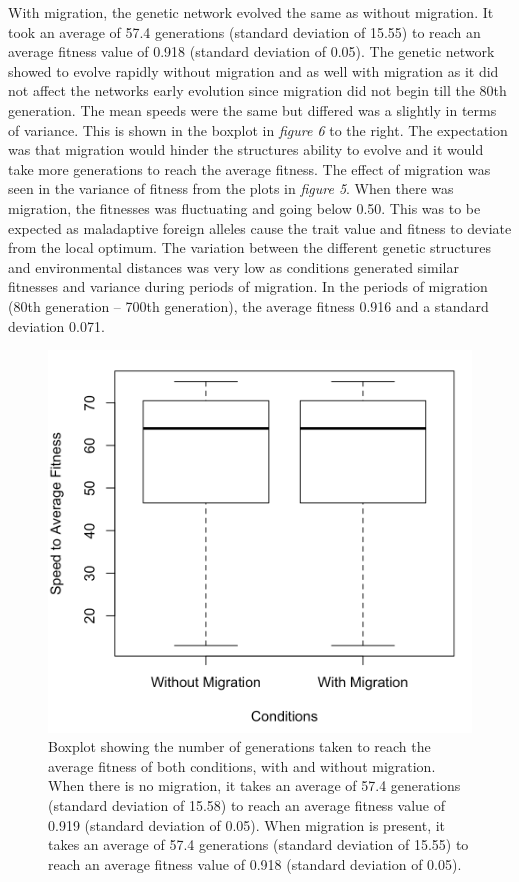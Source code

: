 With migration, the genetic network evolved the same as without migration. It took an average of 57.4 generations (standard deviation of 15.55) to reach an average fitness value of 0.918 (standard deviation of 0.05). The genetic network showed to evolve rapidly without migration and as well with migration as it did not affect the networks early evolution since migration did not begin till the 80th generation. The mean speeds were the same but differed was a slightly in terms of variance. This is shown in the boxplot in \textit{figure 6} to the right. The expectation was that migration would hinder the structures ability to evolve and it would take more generations to reach the average fitness. The effect of migration was seen in the variance of fitness from the plots in \textit{figure 5}. When there was migration, the fitnesses was fluctuating and going below 0.50. This was to be expected as maladaptive foreign alleles cause the trait value and fitness to deviate from the local optimum. The variation between the different genetic structures and environmental distances was very low as conditions generated similar fitnesses and variance during periods of migration. In the periods of migration (80th generation – 700th generation), the average fitness 0.916 and a standard deviation 0.071.

\begin{figure}
    \begin{center}
        \includegraphics[scale=0.4]{../Results/boxplot_migration.jpg}
    \end{center}
    \caption{Boxplot showing the number of generations taken to reach the average fitness of both conditions, with and without migration. When there is no migration, it takes an average of 57.4 generations (standard deviation of 15.58) to reach an average fitness value of 0.919 (standard deviation of 0.05). When migration is present, it takes an average of 57.4 generations (standard deviation of 15.55) to reach an average fitness value of 0.918 (standard deviation of 0.05).}
    \label{fig:Speed to average fit}
\end{figure}
